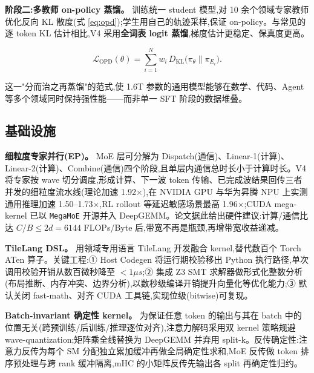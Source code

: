 \documentclass{MathNoteCN}
\begin{document}
\textbf{阶段二:多教师 on-policy 蒸馏。} 训练统一 student 模型,对 10 余个领域专家教师优化反向 KL 散度(式 \ref{eq:opd});学生用自己的轨迹采样,保证 on-policy。与常见的逐 token KL 估计相比,V4 采用\textbf{全词表 logit 蒸馏},梯度估计更稳定、保真度更高。

\begin{equation}
\label{eq:opd}
\mathcal{L}_{\mathrm{OPD}}(\theta)=\sum_{i=1}^{N} w_i\, D_{\mathrm{KL}}\bigl(\pi_\theta \parallel \pi_{E_i}\bigr).
\end{equation}

这一"分而治之再蒸馏"的范式,使 1.6T 参数的通用模型能够在数学、代码、Agent 等多个领域同时保持强性能——而非单一 SFT 阶段的数据堆叠。

\subsection{基础设施}

\textbf{细粒度专家并行(EP)。} MoE 层可分解为 Dispatch(通信)、Linear-1(计算)、Linear-2(计算)、Combine(通信)四个阶段,且单层内通信总时长小于计算时长。V4 将专家按 wave 切分调度,形成计算、下一波 token 传输、已完成波结果回传三者并发的细粒度流水线(理论加速 1.92$\times$),在 NVIDIA GPU 与华为昇腾 NPU 上实测通用推理加速 1.50--1.73$\times$,RL rollout 等延迟敏感场景最高 1.96$\times$;CUDA mega-kernel 已以 \texttt{MegaMoE} 开源并入 DeepGEMM。论文据此给出硬件建议:计算/通信比达 $C/B\le 2d{=}6144$ FLOPs/Byte 后,带宽不再是瓶颈,再增带宽收益递减。

\textbf{TileLang DSL。} 用领域专用语言 TileLang 开发融合 kernel,替代数百个 Torch ATen 算子。关键工程:① Host Codegen 将运行期校验移出 Python 执行路径,单次调用校验开销从数百微秒降至 $<1\mu s$;② 集成 Z3 SMT 求解器做形式化整数分析(布局推断、内存冲突、边界分析),以数秒级编译开销提升向量化等优化能力;③ 默认关闭 fast-math、对齐 CUDA 工具链,实现位级(bitwise)可复现。

\textbf{Batch-invariant 确定性 kernel。} 为保证任意 token 的输出与其在 batch 中的位置无关(跨预训练/后训练/推理逐位对齐),注意力解码采用双 kernel 策略规避 wave-quantization;矩阵乘全线替换为 DeepGEMM 并弃用 split-k。反传确定性:注意力反传为每个 SM 分配独立累加缓冲再做全局确定性求和,MoE 反传做 token 排序预处理与跨 rank 缓冲隔离,mHC 的小矩阵反传先输出各 split 再确定性归约。
\end{document}
